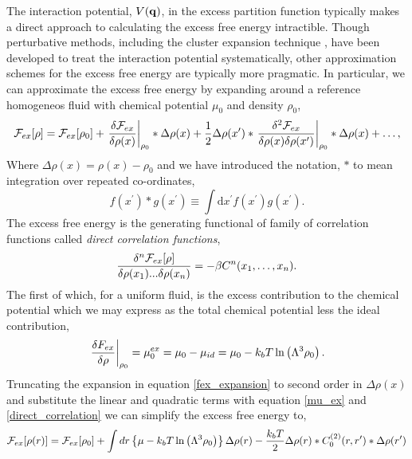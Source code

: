 The interaction potential, $V(\mathbf{q})$, in the excess partition function typically
makes a direct approach to calculating the excess free energy intractible.
Though perturbative methods, including the cluster expansion technique
\cite{MAYER41}, have been developed to treat the interaction potential
systematically, other approximation schemes for the excess free energy are
typically more pragmatic.  In particular, we can approximate the excess free
energy by expanding around a reference homogeneos fluid with chemical potential
$\mu_0$ and density $\rho_0$,
%
\begin{equation}
    \label{fex_expansion}
    \mathcal{F}_{ex}[\rho] = \mathcal{F}_{ex}[\rho_0]
        + \left . \frac{\delta \mathcal{F}_{ex}}{\delta\rho(x)} \right\vert_{\rho_0} \ast \Delta\rho(x) 
        + \frac{1}{2} \Delta\rho(x^\prime) \ast
            \left . \frac{\delta^2 \mathcal{F}_{ex}}{\delta\rho(x)\delta\rho(x^\prime)}
            \right\vert_{\rho_0} \ast \Delta\rho(x) 
        + \dots,
\end{equation}
%
Where $\Delta\rho(x) = \rho(x) - \rho_0$ and we have introduced the notation,
$\ast$ to mean integration over repeated co-ordinates,
%
\begin{equation}
    f(x^\prime) \ast g(x^\prime)
        \equiv \int\mathrm{d}x^\prime f(x^\prime) g(x^\prime).
\end{equation}
%
The excess free energy is the generating functional of family of correlation
functions called \textit{direct correlation functions}, 
%
\begin{equation}
    \label{direct_correlation}
    \frac{\delta^n \mathcal{F}_{ex}[\rho]}{\delta \rho(x_1) ... \delta \rho(x_n)}
        = -\beta C^{n}(x_1, \dots, x_n).
\end{equation}
%
The first of which, for a uniform fluid, is the excess contribution to the
chemical potential which we may express as the total chemical potential less
the ideal contribution, 
%
\begin{equation}
    \label{mu_ex}
    \left.\frac{\delta F_{ex}}{\delta \rho}\right\vert_{\rho_0}
        = \mu_0^{ex}
        = \mu_0 - \mu_{id} 
        = \mu_0 - k_bT\ln\left(\Lambda^3 \rho_0\right).
\end{equation}
%
Truncating the expansion in equation \ref{fex_expansion} to second order in
$\Delta\rho(x)$ and substitute the linear and quadratic terms with equation
\ref{mu_ex} and \ref{direct_correlation} we can simplify the excess free energy
to,
%
\begin{equation}
    \label{F_ex}
    \mathcal{F}_{ex}[\rho(r)] = \mathcal{F}_{ex}[\rho_0] 
        + \int dr 
            \left\lbrace\mu - k_bT \ln\left(\Lambda^3 \rho_0 \right)
            \right\rbrace \Delta\rho(r)
        - \frac{k_b T}{2} \Delta\rho(r) \ast C^{(2)}_0(r, r^\prime) 
            \ast \Delta\rho(r^\prime)
\end{equation}
